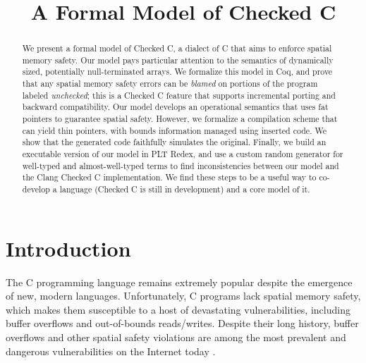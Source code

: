 \documentclass[conference]{IEEEtran}
\begin{document}
\title{A Formal Model of Checked C}         




\maketitle

\begin{abstract}


  We present a formal model of Checked C, a dialect of C
  that aims to enforce spatial memory safety. Our model pays particular
  attention to the semantics of dynamically sized, potentially null-terminated
  arrays.
We formalize this model in Coq, and prove that any spatial memory
  safety errors can be \emph{blamed} on portions of the program
  labeled \emph{unchecked}; this is a Checked C feature that supports
  incremental porting and backward compatibility.
Our model develops an operational semantics that uses fat pointers to
  guarantee spatial safety. However, we formalize a compilation scheme
  that can yield thin pointers, with bounds information managed using
  inserted code. We show that the generated code faithfully simulates
  the original.
Finally, we build an executable version of our model in PLT Redex, 
  and use a custom random generator
  for well-typed and almost-well-typed terms to find
  inconsistencies between our model and the Clang Checked C
  implementation. We find these steps to be a useful way to co-develop a language
  (Checked C is still in development) and a core model of it.
\end{abstract}



\section{Introduction}\label{sec:intros}

The C programming language remains extremely popular despite the
emergence of new, modern languages. Unfortunately, C programs lack
spatial memory safety, which makes them susceptible to a host
of devastating vulnerabilities, including buffer overflows and
out-of-bounds reads/writes. Despite their long history, buffer
overflows and other spatial safety violations are among the most
prevalent and dangerous vulnerabilities on the Internet today \cite{Zeng:2013:SRF:2534766.2534798}.
\end{document}
